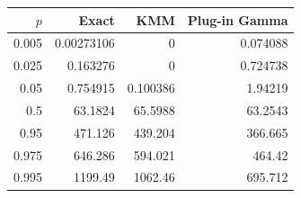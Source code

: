 \begin{tabular}{rrrr}
\toprule
$p$ & Exact & KMM & Plug-in Gamma \\
\midrule
0.005 & 0.00273106 & 0 & 0.074088 \\
0.025 & 0.163276 & 0 & 0.724738 \\
0.05 & 0.754915 & 0.100386 & 1.94219 \\
0.5 & 63.1824 & 65.5988 & 63.2543 \\
0.95 & 471.126 & 439.204 & 366.665 \\
0.975 & 646.286 & 594.021 & 464.42 \\
0.995 & 1199.49 & 1062.46 & 695.712 \\
\bottomrule
\end{tabular}
